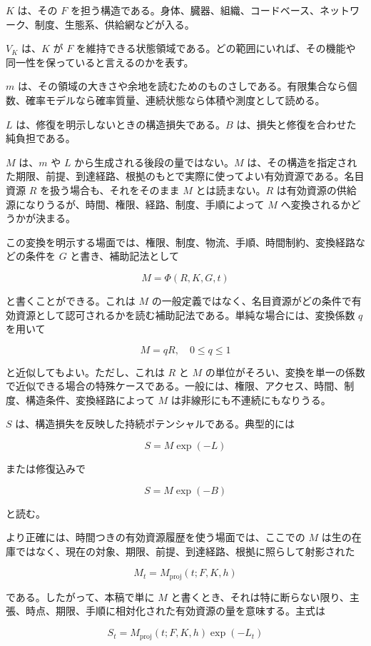 \documentclass[12pt,a4paper]{article}
\begin{document}
\(K\) は、その \(F\) を担う構造である。身体、臓器、組織、コードベース、ネットワーク、制度、生態系、供給網などが入る。

\(V_K\) は、\(K\) が \(F\) を維持できる状態領域である。どの範囲にいれば、その機能や同一性を保っていると言えるのかを表す。

\(m\) は、その領域の大きさや余地を読むためのものさしである。有限集合なら個数、確率モデルなら確率質量、連続状態なら体積や測度として読める。

\(L\) は、修復を明示しないときの構造損失である。\(B\) は、損失と修復を合わせた純負担である。

\(M\) は、\(m\) や \(L\) から生成される後段の量ではない。\(M\) は、その構造を指定された期限、前提、到達経路、根拠のもとで実際に使ってよい有効資源である。名目資源 \(R\) を扱う場合も、それをそのまま \(M\) とは読まない。\(R\) は有効資源の供給源になりうるが、時間、権限、経路、制度、手順によって \(M\) へ変換されるかどうかが決まる。

この変換を明示する場面では、権限、制度、物流、手順、時間制約、変換経路などの条件を \(G\) と書き、補助記法として

\[
M=\Phi(R,K,G,t)
\]

と書くことができる。これは \(M\) の一般定義ではなく、名目資源がどの条件で有効資源として認可されるかを読む補助記法である。単純な場合には、変換係数 \(q\) を用いて

\[
M=qR,\quad 0\leq q\leq 1
\]

と近似してもよい。ただし、これは \(R\) と \(M\) の単位がそろい、変換を単一の係数で近似できる場合の特殊ケースである。一般には、権限、アクセス、時間、制度、構造条件、変換経路によって \(M\) は非線形にも不連続にもなりうる。

\(S\) は、構造損失を反映した持続ポテンシャルである。典型的には

\[
S=M\exp(-L)
\]

または修復込みで

\[
S=M\exp(-B)
\]

と読む。

より正確には、時間つきの有効資源履歴を使う場面では、ここでの \(M\) は生の在庫ではなく、現在の対象、期限、前提、到達経路、根拠に照らして射影された

\[
M_t=M_{\mathrm{proj}}(t;F,K,h)
\]

である。したがって、本稿で単に \(M\) と書くとき、それは特に断らない限り、主張、時点、期限、手順に相対化された有効資源の量を意味する。主式は

\[
S_t=M_{\mathrm{proj}}(t;F,K,h)\exp(-L_t)
\]
\end{document}
